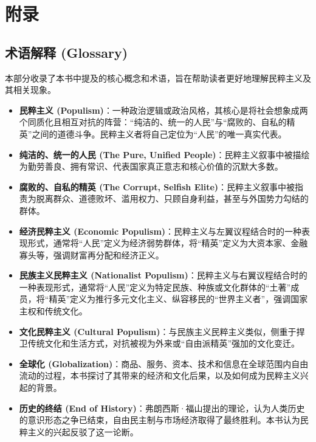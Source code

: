 \chapter{附录}

\section{术语解释 (Glossary)}

本部分收录了本书中提及的核心概念和术语，旨在帮助读者更好地理解民粹主义及其相关现象。

\begin{itemize}
    \item \textbf{民粹主义 (Populism)}：一种政治逻辑或政治风格，其核心是将社会想象成两个同质化且相互对抗的阵营：“纯洁的、统一的人民”与“腐败的、自私的精英”之间的道德斗争。民粹主义者将自己定位为“人民”的唯一真实代表。

    \item \textbf{纯洁的、统一的人民 (The Pure, Unified People)}：民粹主义叙事中被描绘为勤劳善良、拥有常识、代表国家真正意志和核心价值的沉默大多数。

    \item \textbf{腐败的、自私的精英 (The Corrupt, Selfish Elite)}：民粹主义叙事中被指责为脱离群众、道德败坏、滥用权力、只顾自身利益，甚至与外国势力勾结的群体。

    \item \textbf{经济民粹主义 (Economic Populism)}：民粹主义与左翼议程结合时的一种表现形式，通常将“人民”定义为经济弱势群体，将“精英”定义为大资本家、金融寡头等，强调财富再分配和经济正义。

    \item \textbf{民族主义民粹主义 (Nationalist Populism)}：民粹主义与右翼议程结合时的一种表现形式，通常将“人民”定义为特定民族、种族或文化群体的“土著”成员，将“精英”定义为推行多元文化主义、纵容移民的“世界主义者”，强调国家主权和传统文化。

    \item \textbf{文化民粹主义 (Cultural Populism)}：与民族主义民粹主义类似，侧重于捍卫传统文化和生活方式，对抗被视为外来或“自由派精英”强加的文化变迁。

    \item \textbf{全球化 (Globalization)}：商品、服务、资本、技术和信息在全球范围内自由流动的过程，本书探讨了其带来的经济和文化后果，以及如何成为民粹主义兴起的背景。

    \item \textbf{历史的终结 (End of History)}：弗朗西斯·福山提出的理论，认为人类历史的意识形态之争已结束，自由民主制与市场经济取得了最终胜利。本书认为民粹主义的兴起反驳了这一论断。


\end{itemize}
